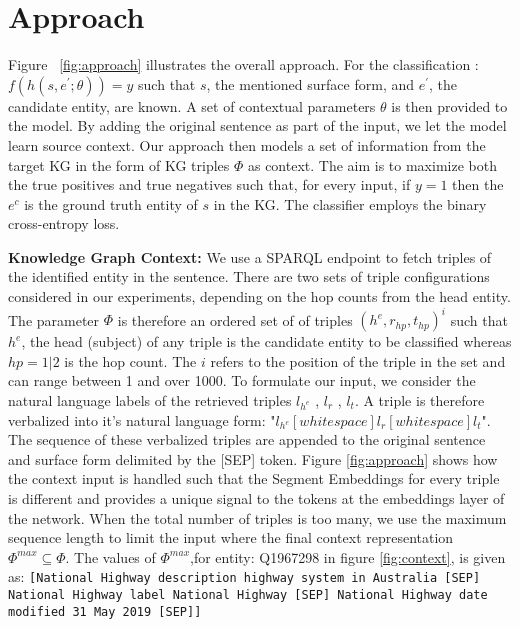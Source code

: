 \documentclass[sigconf, superscriptaddress]{acmart}
\begin{document}
\section{Approach} \label{sect:approach}
Figure ~\ref{fig:approach} illustrates the overall approach. For the classification :
$ f(h(s,e^\prime; \theta)) = y $ such that $ s $, the mentioned surface form, and $e^\prime$, the candidate entity, are known. A set of contextual parameters $ \theta $ is then provided to the model. By adding the original sentence as part of the input, we let the model learn source context. Our approach then models a set of information from the target KG in the form of KG triples $ \Phi $ as context. The aim is to maximize both the true positives and true negatives such that, for every input, if $ y=1 $ then the $ e^c $ is the ground truth entity of $s$ in the KG. The classifier employs the binary cross-entropy loss.

\textbf{Knowledge Graph Context: }We use a SPARQL endpoint to fetch triples of the identified entity in the sentence. There are two sets of triple configurations considered in our experiments, depending on the hop counts from the head entity. The parameter $\Phi$ is therefore an ordered set of of triples $( h^e,r_{hp},t_{hp})^i $ such that $h^e$, the head (subject) of any triple is the candidate entity to be classified whereas $hp = 1|2$ is the hop count. The $i$ refers to the position of the triple in the set and can range between 1 and over 1000. To formulate our input, we consider the natural language labels of the retrieved triples $l_{h^e}$ , $l_{r}$ , $l_{t}$. A triple is therefore verbalized into it's natural language form: "$l_{h^e} [white space] l_{r} [white space] l_{t}$". The sequence of these verbalized triples are appended to the original sentence and surface form delimited by the [SEP] token. Figure \ref{fig:approach} shows how the context input is handled such that the Segment Embeddings for every triple is different and provides a unique signal to the tokens at the embeddings layer of the network.  When the total number of triples is too many, we use the maximum sequence length to limit the input where the final context representation $\Phi^{max} \subseteq \Phi $. The values of $\Phi^{max}$,for entity: Q1967298 in figure \ref{fig:context}, is given as: 
\texttt{\footnotesize{[National Highway description highway system in Australia [SEP] 
National Highway label National Highway [SEP] National Highway date modified 31 May 2019 [SEP]]}}
\end{document}
